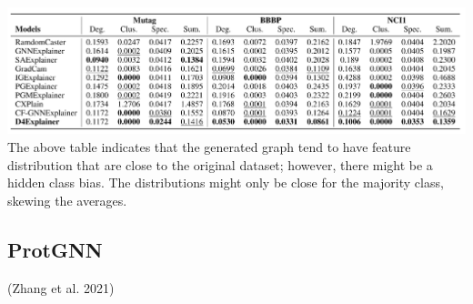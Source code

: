 \documentclass[
  11pt,
  letterpaper,
]{article}
\begin{document}
\begin{itemize}
  \includegraphics{figures/D4-MMD-Table.png} The above table indicates
  that the generated graph tend to have feature distribution that are
  close to the original dataset; however, there might be a hidden class
  bias. The distributions might only be close for the majority class,
  skewing the averages.
\end{itemize}

\hypertarget{protgnn}{%
\subsection{ProtGNN}\label{protgnn}}

(Zhang et al. 2021)
\end{document}
